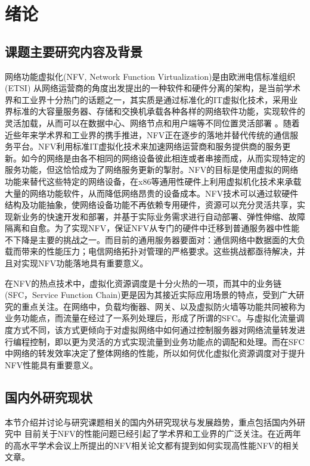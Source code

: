 \chapter{绪论}
\label{chap: Introduction}


\section{课题主要研究内容及背景}
网络功能虚拟化(NFV, Network Function Virtualization)是由欧洲电信标准组织 (ETSI) 从网络运营商的角度出发提出的一种软件和硬件分离的架构，是当前学术界和工业界十分热门的话题之一，其实质是通过标准化的IT虚拟化技术，采用业界标准的大容量服务器、存储和交换机承载各种各样的网络软件功能，实现软件的灵活加载，从而可以在数据中心、网络节点和用户端等不同位置灵活部署 。随着近些年来学术界和工业界的携手推进，NFV正在逐步的落地并替代传统的通信服务平台。NFV利用标准IT虚拟化技术来加速网络运营商和服务提供商的服务更新。如今的网络是由各不相同的网络设备彼此相连或者串接而成，从而实现特定的服务功能，但这恰恰成为了网络服务更新的掣肘。NFV的目标是使用虚拟的网络功能来替代这些特定的网络设备，在x86等通用性硬件上利用虚拟机化技术来承载大量的网络功能软件，从而降低网络昂贵的设备成本。NFV技术可以通过软硬件结构及功能抽象，使网络设备功能不再依赖专用硬件，资源可以充分灵活共享，实现新业务的快速开发和部署，并基于实际业务需求进行自动部署、弹性伸缩、故障隔离和自愈。为了实现NFV，保证NFV从专门的硬件中迁移到普通服务器中性能不下降是主要的挑战之一。而目前的通用服务器要面对：通信网络中数据面的大负载而带来的性能压力；电信网络拓扑对管理的严格要求。这些挑战都亟待解决，并且对实现NFV功能落地具有重要意义。

在NFV的热点技术中，虚拟化资源调度是十分火热的一项，而其中的业务链(SFC，Service Function Chain)更是因为其接近实际应用场景的特点，受到广大研究的重点关注。在网络中，负载均衡器、网关、以及虚拟防火墙等功能共同被称为业务功能点，而流量在经过了一系列处理后，形成了所谓的SFC。与虚拟化流量调度方式不同，该方式更倾向于对虚拟网络中如何通过控制服务器对网络流量转发进行编程控制，即以更为灵活的方式实现流量到业务功能点的调配和处理。而在SFC中网络的转发效率决定了整体网络的性能，所以如何优化虚拟化资源调度对于提升NFV性能具有重要意义。

\section{国内外研究现状}
本节介绍并讨论与研究课题相关的国内外研究现状与发展趋势，重点包括国内外研究中
目前关于NFV的性能问题已经引起了学术界和工业界的广泛关注。在近两年的高水平学术会议上所提出的NFV相关论文都有提到如何实现高性能NFV的相关文章。

